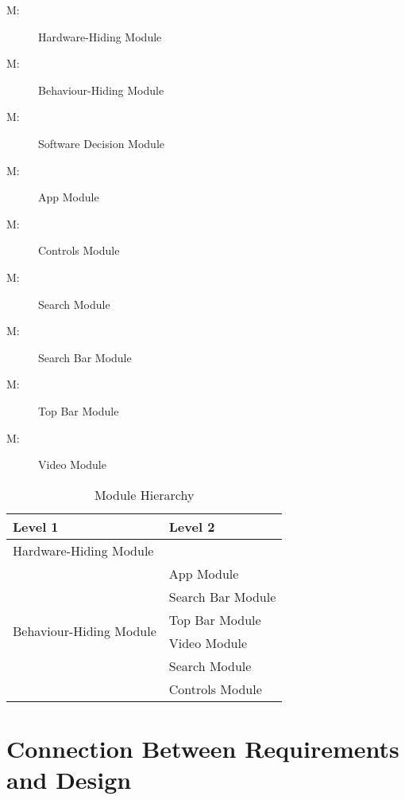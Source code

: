 \documentclass[12pt, titlepage]{article}
\newcounter{mnum}
\newcommand{\mthemnum}{M\themnum}
\begin{document}
\begin{description}
\item [ \mthemnum \label{mHH}:] Hardware-Hiding Module
\item [ \mthemnum \label{mBH}:] Behaviour-Hiding Module
\item [ \mthemnum \label{mSD}:] Software Decision Module
\item [ \mthemnum \label{mAP}:] App Module
\item [ \mthemnum \label{mCT}:] Controls Module
\item [ \mthemnum \label{mSE}:] Search Module
\item [ \mthemnum \label{mSB}:] Search Bar Module
\item [ \mthemnum \label{mTB}:] Top Bar Module
\item [ \mthemnum \label{mVD}:] Video Module
\end{description}


\begin{table}[h!]
\centering
\begin{tabular}{p{} p{}}
\toprule
\textbf{Level 1} & \textbf{Level 2}\\
\midrule

{Hardware-Hiding Module} & ~ \\
\midrule

\multirow{7}{0.3\textwidth}{Behaviour-Hiding Module}
& App Module\\
& Search Bar Module\\
& Top Bar Module\\
& Video Module\\
\midrule

\multirow{3}{0.3\textwidth}{Software Decision Module}
& Search Module\\
& Controls Module\\
\bottomrule

\end{tabular}
\caption{Module Hierarchy}
\label{TblMH}
\end{table}

\section{Connection Between Requirements and Design} \label{SecConnection}
\end{document}
